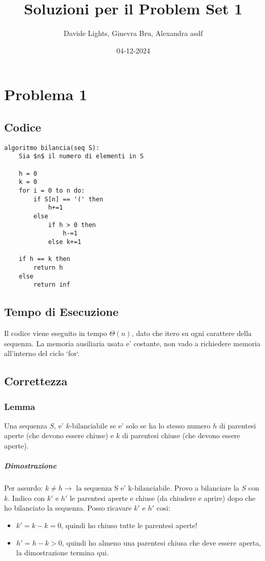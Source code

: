 \documentclass{article}
\title{Soluzioni per il Problem Set 1}
\date{04-12-2024}
\author{Davide Lights, Ginevra Bru, Alexandra asdf}
\begin{document}
\maketitle
{}
\newpage
{}

\section{ Problema 1 }

\subsection{ Codice }

\begin{lstlisting}[language=pseudocode, mathescape=true]
algoritmo bilancia(seq S):
    Sia $n$ il numero di elementi in S

    h = 0
    k = 0
    for i = 0 to n do:
        if S[n] == '(' then
            h+=1
        else
            if h > 0 then 
                h-=1
            else k+=1
    
    if h == k then
        return h
    else 
        return inf
\end{lstlisting}

    \subsection{ Tempo di Esecuzione }
        Il codice viene eseguito in tempo $\Theta(n)$, dato che itero su ogni carattere della sequenza. 
        La memoria ausiliaria usata e' costante, non vado a richiedere memoria all'interno del ciclo `for`.

    \subsection{ Correttezza }
        \subsubsection { Lemma }
            Una sequenza $S$, e' $k \text{-bilanciabile}$ se e' solo se 
            ha lo stesso numero $h$ di parentesi aperte (che devono essere chiuse) e $k$ di parentesi chiuse (che devono essere aperte). 

            \subparagraph{ Dimostrazione }
                Per assurdo: $k \neq h \to \text{ la sequenza S e' k-bilanciabile}$. Provo a bilanciare la $S$ con $k$. Indico con $k'$ e $h'$ le parentesi aperte e chiuse (da chiudere e aprire)  dopo che ho bilanciato la sequenza. Posso ricavare $k'$ e $h'$ cosi:
                \begin{itemize}
                    \item $k' = k - k = 0$, quindi ho chiuso tutte le parentesi aperte!
                    \item $h' = h - k > 0$, quindi ho almeno una parentesi chiusa che deve essere aperta, la dimostrazione termina qui.
                \end{itemize}
\end{document}
